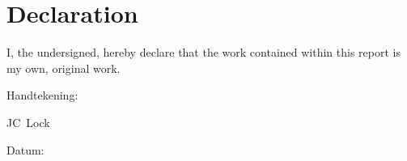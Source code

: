 \chapter{Declaration}

I, the undersigned, hereby declare that the work contained within this report is my own, original work.\par
\vspace{1.5cm}

\noindent%
\parbox{.5\textwidth}{%
  Handtekening:\quad\dotfill\par
  \hfill JC\ Lock\hspace{1.2cm}\null}\vspace{1cm}
\newline

\vspace{1.5cm}
\noindent%
\parbox{.5\textwidth}{%
  Datum:\quad\dotfill\par}
